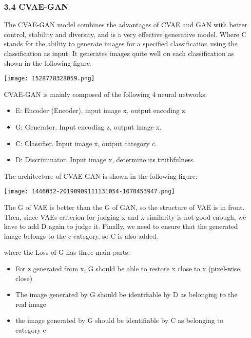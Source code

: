 \documentclass[
]{article}
\begin{document}
\hypertarget{34-cvae-gan}{%
\subsubsection{3.4 CVAE-GAN}\label{34-cvae-gan}}

The CVAE-GAN model combines the advantages of CVAE and GAN with better
control, stability and diversity, and is a very effective generative
model. Where C stands for the ability to generate images for a specified
classification using the classification as input. It generates images
quite well on each classification as shown in the following figure.

\texttt{[image: 1528778328059.png]}

CVAE-GAN is mainly composed of the following 4 neural networks:

\begin{itemize}
\item
  E: Encoder (Encoder), input image x, output encoding z.
\item
  G: Generator. Input encoding z, output image x.
\item
  C: Classifier. Input image x, output category c.
\item
  D: Discriminator. Input image x, determine its truthfulness.
\end{itemize}

The architecture of CVAE-GAN is shown in the following figure:

\texttt{[image: 1446032-20190909111131054-1070453947.png]}

The G of VAE is better than the G of GAN, so the structure of VAE is in
front. Then, since VAE\textquotesingle s criterion for judging
x\textquotesingle{} and x similarity is not good enough, we have to add
D again to judge it. Finally, we need to ensure that the generated image
belongs to the c-category, so C is also added.

where the Loss of G has three main parts:

\begin{itemize}
\item
  For z generated from x, G should be able to restore
  x\textquotesingle{} close to x (pixel-wise close)
\item
  The image generated by G should be identifiable by D as belonging to
  the real image
\item
  the image generated by G should be identifiable by C as belonging to
  category c
\end{itemize}
\end{document}
